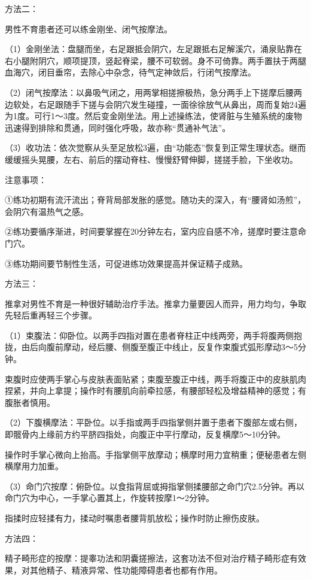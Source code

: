 \documentclass[12pt,UTF8]{ctexbook}
\begin{document}
方法二：

男性不育患者还可以练金刚坐、闭气按摩法。

（1）金刚坐法：盘腿而坐，右足跟抵会阴穴，左足跟抵右足解溪穴，涌泉贴靠在右小腿附阴穴，顺项提顶，竖起脊梁，腰不可软弱。身不可倚靠。两手置扶于两腿血海穴，闭目垂帘，去除心中杂念，待气定神敛后，行闭气按摩法。

（2）闭气按摩法：以鼻吸气闭之，用两掌相搓擦极热，急分两手上下搓摩后腰两边软处，右足跟随手下搓与会阴穴发生碰撞，一面徐徐放气从鼻出，周而复始24遍为1度。可行1～3度。然后变金刚坐法。用上述操练法，使肾脏与生殖系统的废物迅速得到排除和贯通，同时强化呼吸，故亦称“贯通补气法”。

（3）收功法：依次觉察从头至足放松3遍，由“功能态”恢复到正常生理状态。继而缓缓摇头晃腰，左右、前后的摆动脊柱、慢慢舒臂伸脚，搓搓手脸，下坐收功。

注意事项：

①练功初期有流汗流出；脊背局部发胀的感觉。随功夫的深入，有“腰肾如汤煎”，会阴穴有温热气之感。

②练功要循序渐进，时间要掌握在20分钟左右，室内应自感不冷，搓摩时要注意命门穴。

③练功期间要节制性生活，可促进练功效果提高并保证精子成熟。

方法三：

推拿对男性不育是一种很好辅助治疗手法。推拿力量要因人而异，用力均匀，争取先轻后重再轻三个步骤。

（1）束腹法：仰卧位。以两手四指对置在患者脊柱正中线两旁，两手将腹两侧抱拢，由后向腹前摩动，经后腰、侧腹至腹正中线止，反复作束腹式弧形摩动3～5分钟。

束腹时应使两手掌心与皮肤表面贴紧；束腹至腹正中线，两手将腹正中的皮肤肌肉捏紧，并向上拿提；操作时有腰肌向前牵拉感，有腰部轻松及增益精神的感觉；有腹胀者慎用。

（2）下腹横摩法：平卧位。以手指或两手四指掌侧并置于患者下腹部左或右侧，即髋骨内上缘前方约平脐四指处，向腹正中平行摩动，反复横摩5～10分钟。

操作时手掌心微向上抬高。手指掌侧平放摩动；横摩时用力宜稍重；便秘患者左侧横摩用力加重。

（3）命门穴按摩：俯卧位。以食指背屈或拇指掌侧揉腰部之命门穴2.5分钟。再以命门穴为中心，一手掌心置其上，作旋转按摩1～2分钟。

指揉时应轻揉有力，揉动时嘱患者腰背肌放松；操作时防止擦伤皮肤。

方法四：

精子畸形症的按摩：提睾功法和阴囊搓擦法，这套功法不但对治疗精子畸形症有效果，对其他精子、精液异常、性功能障碍患者也都有作用。
\end{document}
